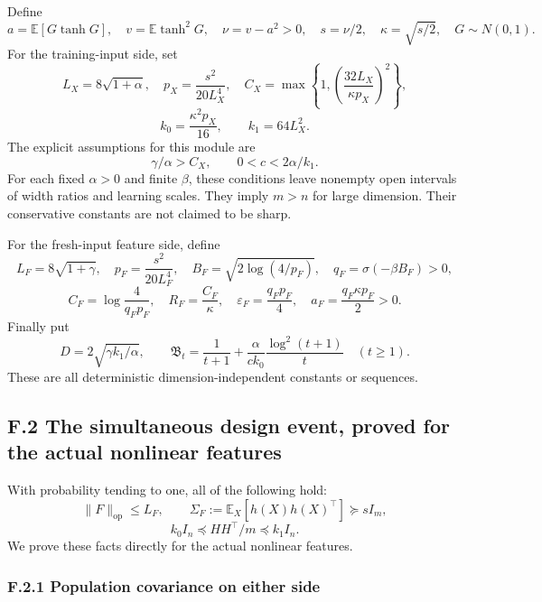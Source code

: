 \documentclass[
  11pt,
  a4paper,
]{article}
\begin{document}
Define \[
a=\mathbb E[G\tanh G],\quad v=\mathbb E\tanh^2G,\quad
\nu=v-a^2>0,\quad s=\nu/2,\quad \kappa=\sqrt{s/2},
\quad G\sim N(0,1).
\] For the training-input side, set \[
L_X=8\sqrt{1+\alpha},\quad p_X=\frac{s^2}{20L_X^4},\quad
C_X=\max\left\{1,\left(\frac{32L_X}{\kappa p_X}\right)^2\right\},
\] \[
k_0=\frac{\kappa^2p_X}{16},\qquad k_1=64L_X^2.
\tag{F.1.2}
\] The explicit assumptions for this module are \[
\boxed{\qquad\gamma/\alpha>C_X,\qquad 0<c<2\alpha/k_1.\qquad}
\tag{F.1.3}
\] For each fixed \(\alpha>0\) and finite \(\beta\), these conditions
leave nonempty open intervals of width ratios and learning scales. They
imply \(m>n\) for large dimension. Their conservative constants are not
claimed to be sharp.

For the fresh-input feature side, define \[
L_F=8\sqrt{1+\gamma},\quad p_F=\frac{s^2}{20L_F^4},\quad
B_F=\sqrt{2\log(4/p_F)},\quad q_F=\sigma(-\beta B_F)>0,
\] \[
C_F=\log\frac4{q_Fp_F},\quad
R_F=\frac{C_F}{\kappa},\quad
\varepsilon_F=\frac{q_Fp_F}{4},\quad
a_F=\frac{q_F\kappa p_F}{2}>0.
\tag{F.1.4}
\] Finally put \[
D=2\sqrt{\gamma k_1/\alpha},\qquad
\mathfrak B_t=\frac1{t+1}+\frac{\alpha}{ck_0}\frac{\log^2(t+1)}t
\quad(t\ge1).
\tag{F.1.5}
\] These are all deterministic dimension-independent constants or
sequences.

\hypertarget{f.2-the-simultaneous-design-event-proved-for-the-actual-nonlinear-features}{%
\subsection{F.2 The simultaneous design event, proved for the actual
nonlinear
features}\label{f.2-the-simultaneous-design-event-proved-for-the-actual-nonlinear-features}}

With probability tending to one, all of the following hold: \[
\|F\|_{\mathrm{op}}\le L_F,\qquad
\Sigma_F:=\mathbb E_X[h(X)h(X)^\top]\succeq sI_m,
\tag{F.2.1}
\] \[
k_0I_n\preceq HH^\top/m\preceq k_1I_n.
\tag{F.2.2}
\] We prove these facts directly for the actual nonlinear features.

\hypertarget{f.2.1-population-covariance-on-either-side}{%
\subsubsection{F.2.1 Population covariance on either
side}\label{f.2.1-population-covariance-on-either-side}}
\end{document}

